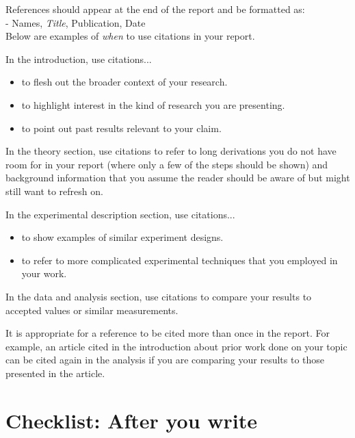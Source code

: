 \documentclass[12pt]{article}
\begin{document}
References should appear at the end of the report and be formatted as:\\

- Names, {\it Title}, Publication, Date\\

Below are examples of {\it when} to use citations in your report.

In the introduction, use citations...

\begin{itemize}
\item to flesh out the broader context of your research.
\item to highlight interest in the kind of research you are
  presenting.
\item to point out past results relevant to your claim.
\end{itemize}

In the theory section, use citations to refer to long derivations
you do not have room for in your report (where only a few of the steps
should be shown) and background information that you assume the reader
should be aware of but might still want to refresh on.

In the experimental description section, use citations...

\begin{itemize}
\item to show examples of similar experiment designs.
\item to refer to more complicated experimental techniques that you
  employed in your work.
\end{itemize}

In the data and analysis section, use citations to compare your
results to accepted values or similar measurements.

It is appropriate for a reference to be cited more than once in the
report.  For example, an article cited in the introduction about prior
work done on your topic can be cited again in the analysis if you are
comparing your results to those presented in the article.


\newpage

\section{Checklist: After you write}
\label{sec:post-chk}
\end{document}
